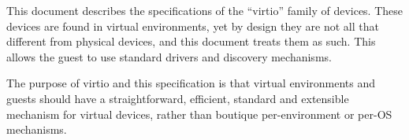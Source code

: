 This document describes the specifications of the “virtio” family of
devices. These devices are found in virtual environments, yet by
design they are not all that different from physical devices, and this
document treats them as such. This allows the guest to use standard
drivers and discovery mechanisms.

The purpose of virtio and this specification is that virtual
environments and guests should have a straightforward, efficient,
standard and extensible mechanism for virtual devices, rather
than boutique per-environment or per-OS mechanisms.
